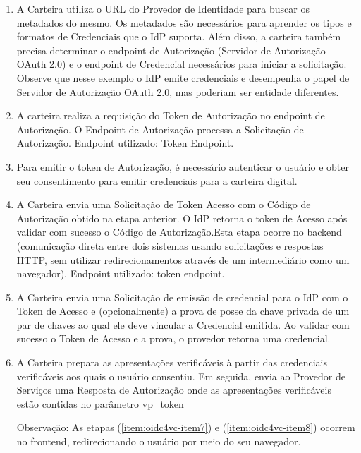 \begin{enumerate}
    \item  A Carteira utiliza o URL do Provedor de Identidade para buscar os metadados do mesmo. Os metadados são necessários para aprender os tipos e formatos de Credenciais que o \acs{IdP} suporta. Além disso, a carteira também precisa determinar o endpoint de Autorização (Servidor de Autorização OAuth 2.0) e o endpoint de Credencial necessários para iniciar a solicitação. Observe que nesse exemplo o \acs{IdP} emite credenciais e desempenha o papel de Servidor de Autorização OAuth 2.0, mas poderiam ser entidade diferentes.

    \item \label{item:oidc4vc-item7} A carteira realiza a requisição do Token de Autorização no endpoint de Autorização. O Endpoint de Autorização processa a Solicitação de Autorização. Endpoint utilizado: Token Endpoint.

    \item \label{item:oidc4vc-item8} Para emitir o token de Autorização, é necessário autenticar o usuário e obter seu consentimento para emitir credenciais para a carteira digital.

    \item A Carteira envia uma Solicitação de Token Acesso com o Código de Autorização obtido na etapa anterior. O \acs{IdP} retorna o token de Acesso após validar com sucesso o Código de Autorização.Esta etapa ocorre no backend (comunicação direta entre dois sistemas usando solicitações e respostas HTTP, sem utilizar redirecionamentos através de um intermediário como um navegador). Endpoint utilizado: token endpoint.

    \item A Carteira envia uma Solicitação de emissão de credencial para o \acs{IdP} com o Token de Acesso e (opcionalmente) a prova de posse da chave privada de um par de chaves ao qual ele deve vincular a Credencial emitida. Ao validar com sucesso o Token de Acesso e a prova, o provedor retorna uma credencial.
    
    \item A Carteira prepara as apresentações verificáveis à partir das credenciais verificáveis aos quais o usuário consentiu. Em seguida, envia ao Provedor de Serviços uma Resposta de Autorização onde as apresentações verificáveis estão contidas no parâmetro vp\_token
    
    Observação: As etapas (\ref{item:oidc4vc-item7}) e (\ref{item:oidc4vc-item8}) ocorrem no frontend, redirecionando o usuário por meio do seu navegador.
    
\end{enumerate}
